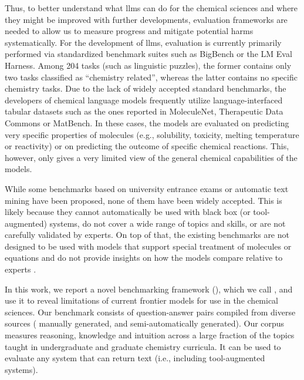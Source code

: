 \documentclass[11pt, oneside]{article}
\begin{document}
\begin{refsection}
Thus, to better understand what \glspl{llm} can do for the chemical sciences and where they might be improved with further developments, evaluation frameworks are needed to allow us to measure progress and mitigate potential harms systematically.
For the development of \glspl{llm}, evaluation is currently primarily performed via standardized benchmark suites such as BigBench\autocite{srivastava2022beyond} or the LM Eval Harness.\autocite{eval-harness}
Among 204 tasks (such as linguistic puzzles), the former contains only two tasks classified as \enquote{chemistry related}, whereas the latter contains no specific chemistry tasks.
Due to the lack of widely accepted standard benchmarks, the developers of chemical language models\autocite{jablonka2024leveraging, guo2023large, ahmad2022chemberta2, Cai_2024, frey2023neural} frequently utilize language-interfaced\autocite{dinh2022lift} tabular datasets such as the ones reported in MoleculeNet,\autocite{wu2018moleculenet} Therapeutic Data Commons\autocite{huang2021therapeutics} or MatBench.\autocite{Dunn_2020}
In these cases, the models are evaluated on predicting very specific properties of molecules (e.g., solubility, toxicity, melting temperature or reactivity) or on predicting the outcome of specific chemical reactions.
This, however, only gives a very limited view of the general chemical capabilities of the models.

While some benchmarks based on university entrance exams\autocite{Zaki_2024, arora2023llms} or automatic text mining\autocite{song2023honeybee, wei2021chemistryqa, song-etal-2023-matsci} have been proposed, none of them have been widely accepted.
This is likely because they cannot automatically be used with black box (or tool-augmented) systems, do not cover a wide range of topics and skills, or are not carefully validated by experts.
On top of that, the existing benchmarks are not designed to be used with models that support special treatment of molecules or equations and do not provide insights on how the models compare relative to experts \autocite{wu2018moleculenet}.

In this work, we report a novel benchmarking framework  (), which we call \chembench, and use it to reveal limitations of current frontier models for use in the chemical sciences.
Our benchmark consists of \xspace question-answer pairs compiled from diverse sources (\xspace manually generated, and \xspace semi-automatically generated).
Our corpus measures reasoning, knowledge and intuition across a large fraction of the topics taught in undergraduate and graduate chemistry curricula. It can be used to evaluate any system that can return text (i.e., including tool-augmented systems).


\end{refsection}
\end{document}
